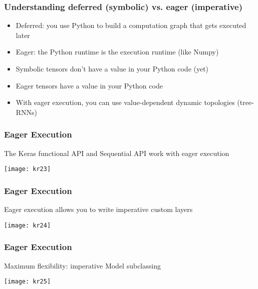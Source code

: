 \begin{frame}[fragile] \frametitle{Understanding deferred (symbolic)
vs. eager (imperative)}

\begin{itemize}
\item  Deferred: you use Python to build a computation graph that gets executed later
\item  Eager: the Python runtime is the execution runtime (like Numpy)
\item Symbolic tensors don’t have a value in your Python code (yet)
\item  Eager tensors have a value in your Python code
\item With eager execution, you can use value-dependent dynamic topologies 
(tree-RNNs)
\end{itemize}
\end{frame}

\begin{frame}[fragile] \frametitle{Eager Execution}

The Keras functional API and Sequential API work with eager execution


\begin{center}
\texttt{[image: kr23]}
\end{center}
\end{frame}


\begin{frame}[fragile] \frametitle{Eager Execution}

Eager execution allows you to write imperative custom layers


\begin{center}
\texttt{[image: kr24]}
\end{center}
\end{frame}

\begin{frame}[fragile] \frametitle{Eager Execution}

Maximum flexibility: imperative Model subclassing

\begin{center}
\texttt{[image: kr25]}
\end{center}
\end{frame}



